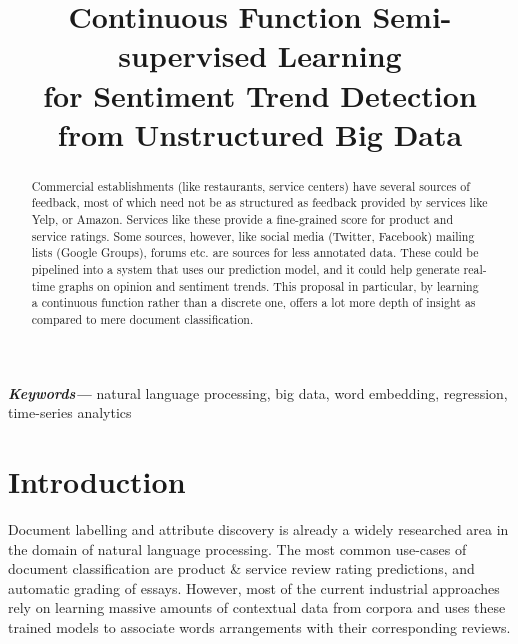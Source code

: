 \documentclass[conference]{IEEEtran}
\begin{document}
\title{Continuous Function Semi-supervised Learning\\ for Sentiment Trend Detection \\from Unstructured Big Data}


\author{
}

\maketitle

\begin{abstract}
Commercial establishments (like restaurants, service centers) have several sources of feedback, most of which need not be as structured as feedback provided by services like Yelp, or Amazon. Services like these provide a fine-grained score for product and service ratings. Some sources, however, like social media (Twitter, Facebook) mailing lists (Google Groups), forums etc. are sources for less annotated data. These could be pipelined into a system that uses our prediction model, and it could help generate real-time graphs on opinion and sentiment trends. This proposal in particular, by learning a continuous function rather than a discrete one, offers a lot more depth of insight as compared to mere document classification.
\end{abstract}


\providecommand{\keywords}[1]{\textbf{\textit{Keywords---}} #1}
\keywords{natural language processing, big data, word embedding, regression, time-series analytics}

\IEEEpeerreviewmaketitle

\section{Introduction}
Document labelling and attribute discovery is already a widely researched area in the domain of natural language processing. The most common use-cases of document classification are product \& service review rating predictions, and automatic grading of essays. However, most of the current industrial approaches rely on learning massive amounts of contextual data from corpora and uses these trained models to associate words arrangements with their corresponding reviews\cite{bespalov2011sentiment}.
\end{document}
